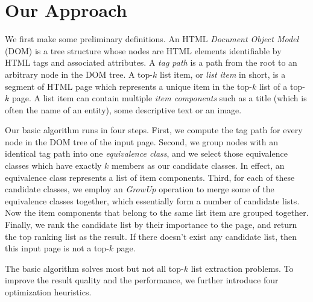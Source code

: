 \section{Our Approach}
\label{sec:algo}
We first make some preliminary definitions.
An HTML {\em Document Object Model} (DOM) is a tree structure whose nodes are 
HTML elements identifiable by HTML tags and associated attributes. 
A {\em tag path} is a path from the root to an arbitrary node in the DOM tree. 
A top-$k$ list item, or {\em list item} in short, is a segment of HTML page which
represents a unique item in the top-$k$ list of a top-$k$ page. 
A list item can contain multiple {\em item components} such as a title (which is
often the name of an entity), some descriptive text or an image.

Our basic algorithm runs in four steps. First, we compute the tag path
for every node in the DOM tree of the input page. Second, we group nodes
with an identical tag path into one {\em equivalence class}, and we
select those equivalence classes which have exactly $k$ members as our
candidate classes. In effect, an equivalence class represents a list of 
item components. Third, for each of these candidate classes, we
employ an {\em GrowUp} operation to merge some of the equivalence classes
together, which essentially form a number of candidate lists. Now
the item components that belong to the same list item are grouped together.
Finally, we rank the candidate list by their importance to the page, and
return the top ranking list as the result. If there doesn't exist any
candidate list, then this input page is not a top-$k$ page.

The basic algorithm solves most but not all top-$k$ list extraction problems.
To improve the result quality and the performance, we further introduce
four optimization heuristics.

